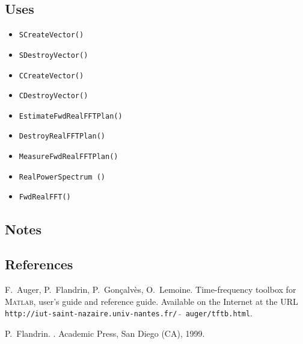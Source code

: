 \documentclass{article}
\begin{document}
\subsection{Uses}
\begin{itemize}
\item\texttt{SCreateVector()} 
\item\texttt{SDestroyVector()}
\item\texttt{CCreateVector()} 
\item\texttt{CDestroyVector()}
\item\texttt{EstimateFwdRealFFTPlan()}
\item\texttt{DestroyRealFFTPlan()}
\item\texttt{MeasureFwdRealFFTPlan()}
\item\texttt{RealPowerSpectrum ()}
\item\texttt{FwdRealFFT()}
\end{itemize}

\subsection{Notes}

\subsection{References}

\begin{thebibliography}{0}

F.~Auger, P.~Flandrin, P.~Gon\c{c}alv\`es, O.~Lemoine.
\newblock Time-frequency toolbox for M\textsc{atlab}, 
user's guide and reference guide.
\newblock Available on the Internet at the URL 
\texttt{http://iut-saint-nazaire.univ-nantes.fr/ $\tilde{ }$\,auger/tftb.html}.

P.~Flandrin.
.
\newblock Academic Press, San Diego (CA), 1999.
\end{thebibliography}
\end{document}
